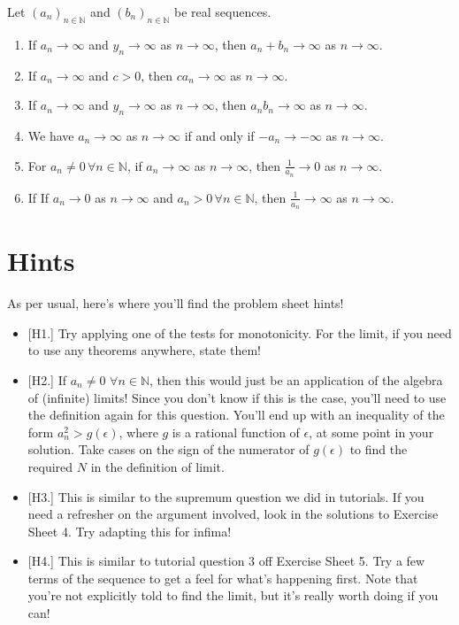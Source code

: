 \documentclass[
  17pt,
  a4paper]{extarticle}
\providecommand{\tightlist}{%
  \setlength{\itemsep}{0pt}\setlength{\parskip}{0pt}}
\theoremstyle{plain}
\theoremstyle{plain}
\theoremstyle{plain}
\theoremstyle{plain}
\theoremstyle{plain}
\theoremstyle{definition}
\theoremstyle{definition}
\theoremstyle{definition}
\theoremstyle{remark}
\let\BeginKnitrBlock\begin \let\EndKnitrBlock\end
\renewcommand{\;}{\,}
\begin{document}
\BeginKnitrBlock{theorem}[Algebra of Infinite Limits]
{\label{thm:thm4} }Let \((a_n)_{n\in\mathbb{N}}\) and \((b_n)_{n\in\mathbb{N}}\) be real sequences.

\begin{enumerate}
\def\labelenumi{\arabic{enumi}.}
\tightlist
\item
  If \(a_n \to \infty\) and \(y_n \to \infty\) as \(n \to \infty\), then \(a_n + b_n \to \infty\) as \(n\to\infty\).
\item
  If \(a_n \to \infty\) and \(c > 0\), then \(ca_n \to \infty\) as \(n \to \infty\).
\item
  If \(a_n \to \infty\) and \(y_n \to \infty\) as \(n \to \infty\), then \(a_nb_n \to \infty\) as \(n\to\infty\).
\item
  We have \(a_n \to \infty\) as \(n \to \infty\) if and only if \(-a_n \to -\infty\) as \(n \to \infty\).
\item
  For \(a_n \neq 0\; \forall n \in \mathbb{N}\), if \(a_n \to \infty\) as \(n \to \infty\), then \(\frac{1}{a_n} \to 0\) as \(n \to \infty\).
\item
  If If \(a_n \to 0\) as \(n\to\infty\) and \(a_n > 0\; \forall n \in \mathbb{N}\), then \(\frac{1}{a_n} \to \infty\) as \(n \to \infty\).
\end{enumerate}
\EndKnitrBlock{theorem}

\hypertarget{hints}{%
\section{Hints}\label{hints}}

As per usual, here's where you'll find the problem sheet hints!

\begin{itemize}
\tightlist
\item
  {[}H1.{]} Try applying one of the tests for monotonicity. For the limit, if you need to use any theorems anywhere, state them!
\item
  {[}H2.{]} If \(a_n \neq 0 \, \; \forall n \in \mathbb{N}\), then this would just be an application of the algebra of (infinite) limits! Since you don't know if this is the case, you'll need to use the definition again for this question. You'll end up with an inequality of the form \(a_n^2 > g(\epsilon)\), where \(g\) is a rational function of \(\epsilon\), at some point in your solution. Take cases on the sign of the numerator of \(g(\epsilon)\) to find the required \(N\) in the definition of limit.
\item
  {[}H3.{]} This is similar to the supremum question we did in tutorials. If you need a refresher on the argument involved, look in the solutions to Exercise Sheet 4. Try adapting this for infima!
\item
  {[}H4.{]} This is similar to tutorial question 3 off Exercise Sheet 5. Try a few terms of the sequence to get a feel for what's happening first. Note that you're not explicitly told to find the limit, but it's really worth doing if you can!
\end{itemize}
\end{document}

